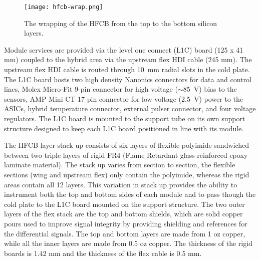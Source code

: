 \begin{figure}[hbt] 
\centering 
\texttt{[image: hfcb-wrap.png]}
\caption{The wrapping of the HFCB from the top to the bottom silicon layers.}
\label{fig:hfcb-wrap}
\end{figure}

Module services are provided via the level one connect (L1C) board (125 x 41 mm) coupled to the hybrid area via the upstream flex HDI cable (245 mm). The upstream flex HDI cable is routed through 10~mm radial slots in the cold plate. The L1C board hosts two high density Nanonics connectors for data and control lines, Molex Micro-Fit 9-pin connector for high voltage ($\sim$85~V) bias to the sensors, AMP Mini CT 17 pin connector for low voltage (2.5~V) power to the ASICs, hybrid temperature connector, external pulser connector, and four voltage regulators. The L1C board is mounted to the support tube on its own support structure designed to keep each L1C board positioned in line with its module.

The HFCB layer stack up consists of six layers of flexible polyimide sandwiched between two triple layers of rigid FR4 (Flame Retardant glass-reinforced epoxy laminate material). The stack up varies from section to section, the flexible sections (wing and upstream flex) only contain the polyimide, whereas the rigid areas contain all 12 layers. This variation in stack up provides the ability to instrument both the top and bottom sides of each module and to pass though the cold plate to the L1C board mounted on the support structure. The two outer layers of the flex stack are the top and bottom shields, which are solid copper pours used to improve signal integrity by providing shielding and references for the differential signals. The top and bottom layers are made from 1 oz copper, while all the inner layers are made from 0.5 oz copper. The thickness of the rigid boards is 1.42 mm and the thickness of the flex cable is 0.5 mm.

